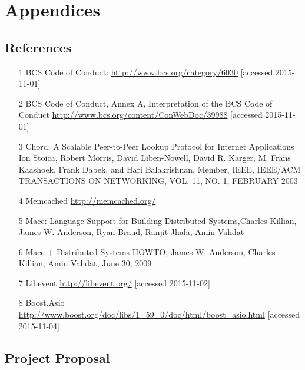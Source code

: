 \documentclass{article}
\begin{document}
\section{Appendices}
\subsection{References}
\begin{itemize}
\item[1] BCS Code of Conduct: \url{http://www.bcs.org/category/6030}  [accessed 2015-11-01]

\item[2] BCS Code of Conduct, Annex A, Interpretation of the BCS Code of Conduct \url{http://www.bcs.org/content/ConWebDoc/39988}  [accessed 2015-11-01]

\item[3] Chord: A Scalable Peer-to-Peer Lookup Protocol for Internet Applications Ion Stoica, Robert Morris, David Liben-Nowell, David R. Karger, M. Frans Kaashoek, Frank Dabek, and Hari Balakrishnan, Member, IEEE, IEEE/ACM TRANSACTIONS ON NETWORKING, VOL. 11, NO. 1, FEBRUARY 2003

\item[4] Memcached \url{http://memcached.org/}

\item[5] Mace: Language Support for Building Distributed Systems,Charles Killian, James W. Anderson, Ryan Braud, Ranjit Jhala, Amin Vahdat

\item[6] Mace + Distributed Systems HOWTO, James W. Anderson, Charles Killian, Amin Vahdat, June 30, 2009

\item[7] Libevent \url{http://libevent.org/} [accessed 2015-11-02]

\item[8] Boost.Asio \url{http://www.boost.org/doc/libs/1_59_0/doc/html/boost_asio.html} [accessed 2015-11-04]


\end{itemize}
\subsection{Project Proposal}
\end{document}
